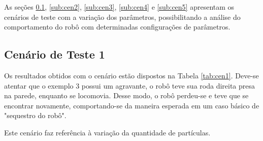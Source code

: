 As seções \ref{sub:cen1}, \ref{sub:cen2}, \ref{sub:cen3}, \ref{sub:cen4} e \ref{sub:cen5} apresentam os cenários de teste com a variação dos parâmetros, possibilitando a análise do comportamento do robô
com determinadas configurações de parâmetros.

\subsection{Cenário de Teste 1}
\label{sub:cen1}

Os resultados obtidos com o cenário estão dispostos na Tabela \ref{tab:cen1}. Deve-se atentar que o exemplo 3 possui um agravante, o
robô teve sua roda direita presa na parede, enquanto se locomovia. Desse modo, o robô perdeu-se e teve que se encontrar novamente, comportando-se
da maneira esperada em um caso básico de "sequestro do robô".

Este cenário faz referência à variação da quantidade de partículas.

